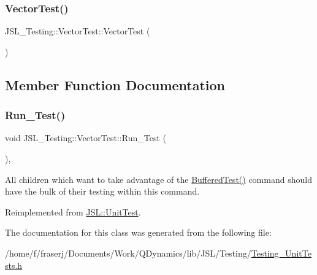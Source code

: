 \subsubsection{\texorpdfstring{Vector\+Test()}{VectorTest()}}
{\footnotesize\ttfamily J\+S\+L\+\_\+\+Testing\+::\+Vector\+Test\+::\+Vector\+Test (\begin{DoxyParamCaption}{ }\end{DoxyParamCaption})\hspace{0.3cm}{\ttfamily [inline]}}



\subsection{Member Function Documentation}
\mbox{\label{classJSL__Testing_1_1VectorTest_ad79bb4654e6f7b59d31d7239ee0c2b82}} 
\subsubsection{\texorpdfstring{Run\+\_\+\+Test()}{Run\_Test()}}
{\footnotesize\ttfamily void J\+S\+L\+\_\+\+Testing\+::\+Vector\+Test\+::\+Run\+\_\+\+Test (\begin{DoxyParamCaption}{ }\end{DoxyParamCaption})\hspace{0.3cm}{\ttfamily [inline]}, {\ttfamily [virtual]}}



All children which want to take advantage of the \hyperlink{classJSL_1_1UnitTest_aabec19b081be8a428f12e4b5e3dc2a9c}{Buffered\+Test()} command should have the bulk of their testing within this command. 



Reimplemented from \hyperlink{classJSL_1_1UnitTest_aa8369ab1ce2a537bff2ea7e1c8818490}{J\+S\+L\+::\+Unit\+Test}.



The documentation for this class was generated from the following file\+:\begin{DoxyCompactItemize}
\item 
/home/f/fraserj/\+Documents/\+Work/\+Q\+Dynamics/lib/\+J\+S\+L/\+Testing/\hyperlink{Testing__UnitTests_8h}{Testing\+\_\+\+Unit\+Tests.\+h}\end{DoxyCompactItemize}
